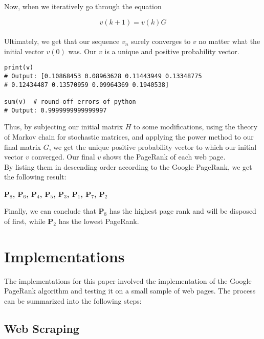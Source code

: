\documentclass{article}
\begin{document}
Now, when we iteratively go through the equation

\[ v(k+1) = v(k)G \]
\\

Ultimately, we get that our sequence \( v_n \) surely converges to \( v \) no matter what the initial vector \( v(0) \) was. Our \( v \) is a unique and positive probability vector.
\\

\begin{verbatim}
print(v)
# Output: [0.10868453 0.08963628 0.11443949 0.13348775 
# 0.12434487 0.13570959 0.09964369 0.1940538]

sum(v)  # round-off errors of python
# Output: 0.9999999999999997
\end{verbatim}


Thus, by subjecting our initial matrix \( H \) to some modifications, using the theory of Markov chain for stochastic matrices, and applying the power method to our final matrix \( G \), we get the unique positive probability vector to which our initial vector \( v \) converged. Our final \( v \) shows the PageRank of each web page.
\\

By listing them in descending order according to the Google PageRank, we get the following result:
\\

\begin{center}
\textbf{\Large{P$_8$, P$_6$, P$_4$, P$_5$, P$_3$, P$_1$, P$_7$, P$_2$}}
\end{center}

Finally, we can conclude that \textbf{P$_{8}$} has the highest page rank and will be disposed of first, while \textbf{P$_{2}$} has the lowest PageRank.
\\

\section{Implementations}

The implementations for this paper involved the implementation of the Google PageRank algorithm and testing it on a small sample of web pages. The process can be summarized into the following steps:

\subsection{Web Scraping}
\end{document}
